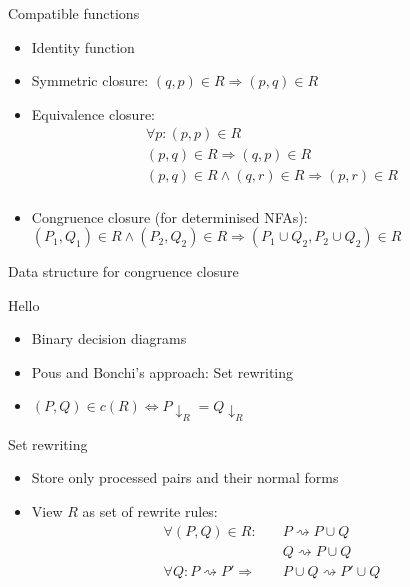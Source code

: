 \documentclass[compress]{beamer}
\begin{document}
\begin{frame}{Compatible functions}
  \begin{itemize}
    \item<1-> Identity function
    \item<2-> Symmetric closure: $(q, p) \in R \Rightarrow (p, q) \in R$
    \item<3-> Equivalence closure:
      \begin{align*}
        \forall p: (p, p) \in R\\
        (p, q) \in R \Rightarrow (q, p) \in R\\
        (p, q) \in R \land (q, r) \in R \Rightarrow (p, r) \in R\\
      \end{align*}
    \item<4-> Congruence closure (for determinised NFAs):\\
        $(P_1, Q_1) \in R \land (P_2, Q_2) \in R \Rightarrow (P_1 \cup Q_2, P_2 \cup Q_2) \in R$
  \end{itemize}
\end{frame}



\begin{frame}{Data structure for congruence closure}
  \begin{block}{Hello}
    \begin{itemize}
        \item Binary decision diagrams
        \item Pous and Bonchi's approach: Set rewriting
        \item $(P, Q) \in c(R) \iff P \downarrow_R = Q \downarrow_R$
    \end{itemize}
  \end{block}
  \begin{figure}
    
  \end{figure}
\end{frame}

\begin{frame}{Set rewriting}
  \begin{itemize}
    \item Store only processed pairs and their normal forms
    \item View $R$ as set of rewrite rules:
      \begin{align*}
        \forall (P, Q) \in R: \quad&P \rightsquigarrow P \cup Q\\
                              &Q \rightsquigarrow P \cup Q\\
        \forall Q: P \rightsquigarrow P' \Rightarrow & P \cup Q \rightsquigarrow P' \cup Q
      \end{align*}
  \end{itemize}
\end{frame}
\end{document}

